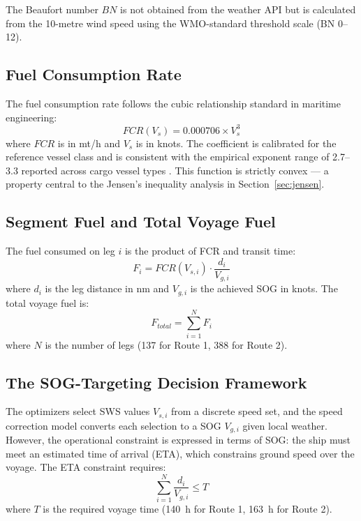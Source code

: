 \documentclass[review]{elsarticle}
\begin{document}
The Beaufort number $BN$ is not obtained from the weather API but is calculated from the 10-metre wind speed using the WMO-standard threshold scale (BN 0--12).

\subsection{Fuel Consumption Rate}
\label{sec:fcr}

The fuel consumption rate follows the cubic relationship standard in maritime engineering:
\begin{equation}
    FCR(V_s) = 0.000706 \times V_s^3
    \label{eq:fcr}
\end{equation}
where $FCR$ is in mt/h and $V_s$ is in knots. The coefficient is calibrated for the reference vessel class and is consistent with the empirical exponent range of 2.7--3.3 reported across cargo vessel types \cite{Psaraftis2013,Psaraftis2023,Taskar2020}. This function is strictly convex --- a property central to the Jensen's inequality analysis in Section~\ref{sec:jensen}.

\subsection{Segment Fuel and Total Voyage Fuel}
\label{sec:fuel-total}

The fuel consumed on leg $i$ is the product of FCR and transit time:
\begin{equation}
    F_i = FCR(V_{s,i}) \cdot \frac{d_i}{V_{g,i}}
    \label{eq:leg-fuel}
\end{equation}
where $d_i$ is the leg distance in nm and $V_{g,i}$ is the achieved SOG in knots. The total voyage fuel is:
\begin{equation}
    F_{total} = \sum_{i=1}^{N} F_i
    \label{eq:total-fuel}
\end{equation}
where $N$ is the number of legs (137 for Route 1, 388 for Route 2).

\subsection{The SOG-Targeting Decision Framework}
\label{sec:sog-framework}

The optimizers select SWS values $V_{s,i}$ from a discrete speed set, and the speed correction model converts each selection to a SOG $V_{g,i}$ given local weather. However, the operational constraint is expressed in terms of SOG: the ship must meet an estimated time of arrival (ETA), which constrains ground speed over the voyage. The ETA constraint requires:
\begin{equation}
    \sum_{i=1}^{N} \frac{d_i}{V_{g,i}} \leq T
    \label{eq:eta}
\end{equation}
where $T$ is the required voyage time (140~h for Route 1, 163~h for Route 2).
\end{document}
